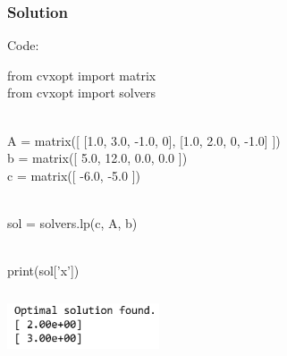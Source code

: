 \documentclass{beamer}
\begin{document}
\begin{frame}
\frametitle{Solution}
\begin{block}{Code:}

from cvxopt import matrix
\\from cvxopt import solvers \vspace{0.5cm}

\\A = matrix([ [1.0, 3.0, -1.0, 0], [1.0, 2.0, 0, -1.0] ])
\\b = matrix([ 5.0, 12.0, 0.0, 0.0 ])
\\c = matrix([ -6.0, -5.0 ])

\\sol = solvers.lp(c, A, b)

\\print(sol['x'])
 \end{block}
  \includegraphics[width=4.5cm,height=2cm,angle=0]{Capture}
\end{frame}
\end{document}

